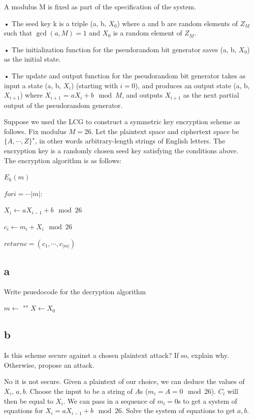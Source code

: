 \documentclass[11pt]{article}
\begin{document}
A modulus M is ﬁxed as part of the speciﬁcation of the system.

• The seed key k is a triple (a, b, $X_0$) where a and b are random elements of $Z_M$ such that $\gcd(a, M ) = 1$ and $X_0$ is a random element of $Z_M$.

• The initialization function for the pseudorandom bit generator saves (a, b, $X_0$) as the initial state.

• The update and output function for the pseudorandom bit generator takes as input a state (a, b, $X_i$) (starting with $i = 0$), and produces an output state (a, b, $X_{i+1}$) where $X_{i+1}$ = $a X_i + b \mod M$, and outputs $X_{i+1}$ as the next partial output of the pseudorandom generator.

Suppose we used the LCG to construct a symmetric key encryption scheme as follows. Fix modulus
$M = 26$. Let the plaintext space and ciphertext space be $\{A, \cdots , Z\}^\star$, in other words arbitrary-length strings of English letters. The encryption key is a randomly chosen seed key satisfying the conditions above. The encryption algorithm is as follows:

$E_k(m)$

$for i = \cdots |m|:$

$X_i \leftarrow a X_{i-1} + b \mod 26$

$c_i \leftarrow m_i + X_i \mod 26$

$return c = (c_1, \cdots, c_{|m|})$

\subsection{a} Write psuedocode for the decryption algorithm

\begin{algorithm}[]
    $m \leftarrow$ ""\;
    $X \leftarrow X_0$\;
\end{algorithm}

\subsection{b} Is this scheme secure against a chosen plaintext attack? If so, explain why. Otherwise, propose an attack.

No it is not secure. Given a plaintext of our choice, we can deduce the values of $X_i$, $a,b$. Choose the input to be a string of $A$s ($m_i = A = 0 \mod 26$). $C_i$ will then be equal to $X_i$. We can pass in a sequence of $m_i = 0$s to get a system of equations for $X_i = aX_{i-1} + b \mod 26$. Solve the system of equations to get $a,b$.
\end{document}
